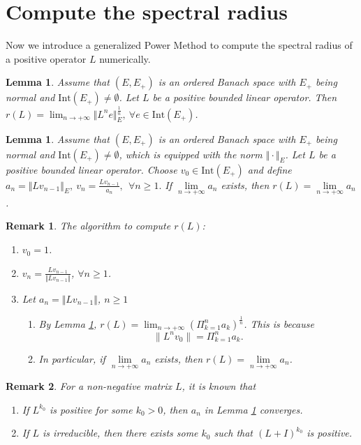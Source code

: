 \documentclass[12pt,reqno]{article}
\newtheorem{lemma}[theorem]{Lemma}
\newtheorem{remark}{Remark}
\newcommand{\Int}{\mathrm{Int}}
\begin{document}
\section{Compute the spectral radius}\label{sec:spectral}
 Now we introduce a generalized Power Method to compute the spectral radius of a positive operator $L$ numerically.

\begin{lemma}\label{lem:com:r(L):1}
	Assume that $(E,E_+)$ is an ordered Banach space with $E_+$ being normal and $\Int (E_+) \neq \emptyset$. Let $L$ be a positive bounded linear operator. Then $r(L)= \lim_{n \rightarrow +\infty } \Vert L^n e \Vert_E^{\frac{1}{n}},~\forall e \in \Int (E_+)$.
\end{lemma}
\begin{lemma}\label{lem:com:r(L):2}
	Assume that $(E,E_+)$ is an ordered Banach space with $E_+$ being normal and $\Int (E_+) \neq \emptyset$, which is equipped with the norm $\Vert \cdot \Vert_E$. Let $L$ be a positive bounded linear operator. Choose $v_0 \in \Int (E_+)$ and define
	$
	a_n=\Vert L v_{n-1} \Vert_E,~
	v_n =\frac{ L v_{n-1}}{a_n}, ~
	~\forall n\geq 1.
	$
	If $\lim\limits_{ n\rightarrow +\infty} a_n$ exists, then $r(L)=\lim\limits_{ n\rightarrow +\infty} a_n$.
\end{lemma}

\begin{remark}\label{rem:com:r(L)}
	The algorithm to compute $r(L)$:
	\begin{enumerate}
		\item $v_0=1$.
		\item $v_n = \frac{L v_{n-1}}{\Vert L v_{n-1} \Vert }$, $\forall n \geq 1$.
		\item Let $a_n =\Vert L v_{n-1} \Vert $, $n\geq 1$
		\begin{enumerate}
			\item By Lemma \ref{lem:com:r(L):1}, $r(L)= \lim_{n \rightarrow +\infty } (\Pi_{k=1}^n a_k )^{\frac{1}{n}}$. This is because
			\begin{equation}
			{\|L^n v_0\|} = \Pi_{k=1}^n a_k .
			\end{equation}
			\item In particular, if $\lim\limits_{ n\rightarrow +\infty} a_n$ exists, then $r(L)=\lim\limits_{ n\rightarrow +\infty} a_n$.
		\end{enumerate}
	\end{enumerate}
\end{remark}

\begin{remark}
	For a  non-negative matrix $L$, it is known that
	\begin{enumerate}
		\item If $L^{k_0}$ is positive for some $k_0>0$, then $a_n$ in Lemma \ref{lem:com:r(L):2} converges.
		\item If $L$ is  irreducible, then there exists some $k_0$ such that $(L+I)^{k_0}$ is positive.
	\end{enumerate}
\end{remark}
\end{document}
